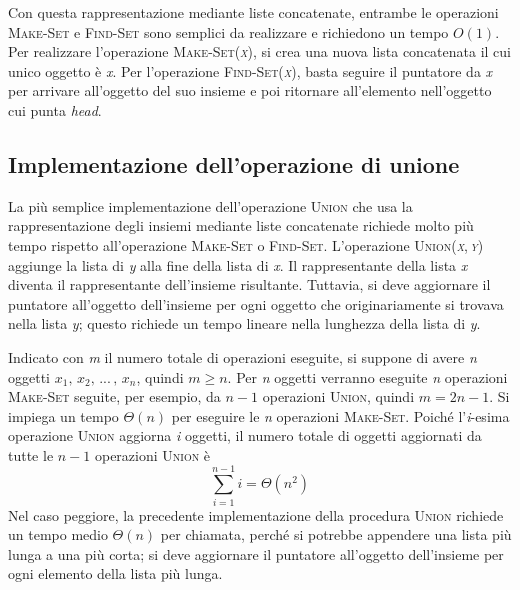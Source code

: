 \documentclass[10pt, a4paper]{report}
\begin{document}
Con questa rappresentazione mediante liste concatenate, entrambe le operazioni \textsc{Make-Set} e \textsc{Find-Set} sono semplici da realizzare e richiedono un tempo $O(1)$. Per realizzare l'operazione \textsc{Make-Set(\textit{x})}, si crea una nuova lista concatenata il cui unico oggetto è \textit{x}. Per l'operazione \textsc{Find-Set(\textit{x})}, basta seguire il puntatore da \textit{x} per arrivare all'oggetto del suo insieme e poi ritornare all'elemento nell'oggetto cui punta \textit{head}.
\subsection{Implementazione dell'operazione di unione}
La più semplice implementazione dell'operazione \textsc{Union} che usa la rappresentazione degli insiemi mediante liste concatenate richiede molto più tempo rispetto all'operazione \textsc{Make-Set} o \textsc{Find-Set}. L'operazione \textsc{Union(\textit{x},\,\textit{y})} aggiunge la lista di \textit{y} alla fine della lista di \textit{x}. Il rappresentante della lista \textit{x} diventa il rappresentante dell'insieme risultante. Tuttavia, si deve aggiornare il puntatore all'oggetto dell'insieme per ogni oggetto che originariamente si trovava nella lista \textit{y}; questo richiede un tempo lineare nella lunghezza della lista di \textit{y}.

Indicato con \textit{m} il numero totale di operazioni eseguite, si suppone di avere \textit{n} oggetti $x_1,\,x_2,\,...\,,\,x_n$, quindi $m \geq n$. Per \textit{n} oggetti verranno eseguite \textit{n} operazioni \textsc{Make-Set} seguite, per esempio, da $n - 1$ operazioni \textsc{Union}, quindi $m = 2n - 1$. Si impiega un tempo $\Theta(n)$ per eseguire le \textit{n} operazioni \textsc{Make-Set}. Poiché l'\textit{i}-esima operazione \textsc{Union} aggiorna \textit{i} oggetti, il numero totale di oggetti aggiornati da tutte le $n - 1$ operazioni \textsc{Union} è
\begin{equation*}
\sum_{i=1}^{n-1}i = \Theta(n^2)
\end{equation*}
Nel caso peggiore, la precedente implementazione della procedura \textsc{Union} richiede un tempo medio $\Theta(n)$ per chiamata, perché si potrebbe appendere una lista più lunga a una più corta; si deve aggiornare il puntatore all'oggetto dell'insieme per ogni elemento della lista più lunga.
\end{document}
